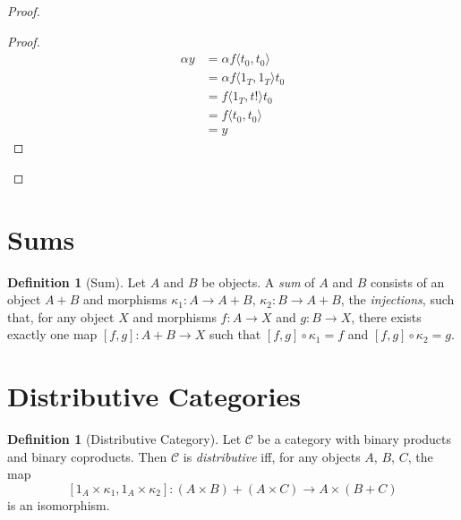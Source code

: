 \documentclass{article}
\let\qed\relax
\theoremstyle{definition}
\newtheorem{definition}[axiom]{Definition}
\begin{document}
\begin{proof}
    \pf
    \begin{proof}
        \pf
        \begin{align*}
            \alpha y & = \alpha f \langle t_0, t_0 \rangle \\
            & = \alpha f \langle 1_T, 1_T \rangle t_0 \\
            & = f \langle 1_T, t ! \rangle t_0 \\
            & = f \langle t_0, t_0 \rangle \\
            & = y
        \end{align*}
    \end{proof}
    \qed
\end{proof}

\section{Sums}

\begin{definition}[Sum]
    Let $A$ and $B$ be objects. A \emph{sum} of $A$ and $B$ consists of an object $A + B$ and
    morphisms $\kappa_1 : A \rightarrow A + B$, $\kappa_2 : B \rightarrow A + B$, the \emph{injections},
    such that, for any object $X$ and morphisms $f : A \rightarrow X$ and $g : B \rightarrow X$, there exists
    exactly one map $[ f, g ] : A + B \rightarrow X$ such that
    $[f,g] \circ \kappa_1 = f$ and $[f,g] \circ \kappa_2 = g$.
\end{definition}

\section{Distributive Categories}

\begin{definition}[Distributive Category]
    Let $\mathcal{C}$ be a category with binary products and binary coproducts. Then $\mathcal{C}$ is
    \emph{distributive} iff, for any objects $A$, $B$, $C$, the map
    \[ [1_A \times \kappa_1, 1_A \times \kappa_2] : (A \times B) + (A \times C) \rightarrow A \times (B + C) \]
    is an isomorphism.
\end{definition}
\end{document}
